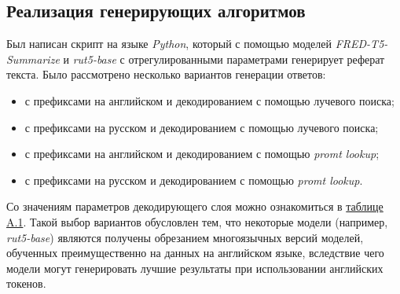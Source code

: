 \documentclass[12pt, a4paper]{article}
\begin{document}
    \subsection{Реализация генерирующих алгоритмов}

    Был написан скрипт на языке \textit{Python}, который с помощью моделей \textit{FRED-T5-Summarize} и \textit{rut5-base} с отрегулированными параметрами генерирует реферат текста. Было рассмотрено несколько вариантов генерации ответов:
    
    \begin{itemize}
    	\item с префиксами на английском и декодированием с помощью лучевого поиска;
    	\item с префиксами на русском и декодированием с помощью лучевого поиска;
    	\item с префиксами на английском и декодированием с помощью \textit{promt lookup};
    	\item с префиксами на русском и декодированием с помощью \textit{promt lookup}.
    \end{itemize}
    Со значениям параметров декодирующего слоя можно ознакомиться в \hyperlink{params}{таблице A.1}. Такой выбор вариантов обусловлен тем, что некоторые модели (например, \textit{rut5-base}) являются получены обрезанием многоязычных версий моделей, обученных преимущественно на данных на английском языке, вследствие чего модели могут генерировать лучшие результаты при использовании английских токенов.
\end{document}
